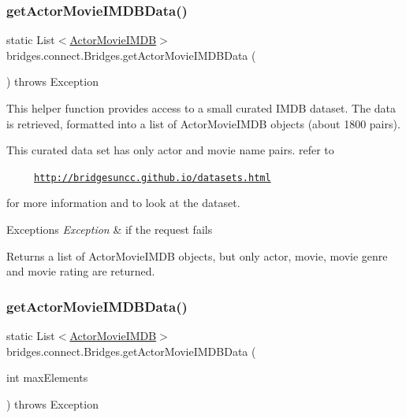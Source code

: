 \subsubsection{\texorpdfstring{get\+Actor\+Movie\+I\+M\+D\+B\+Data()}{getActorMovieIMDBData()}\hspace{0.1cm}{\footnotesize\ttfamily [1/2]}}
{\footnotesize\ttfamily static List$<$\mbox{\hyperlink{classbridges_1_1data__src__dependent_1_1_actor_movie_i_m_d_b}{Actor\+Movie\+I\+M\+DB}}$>$ bridges.\+connect.\+Bridges.\+get\+Actor\+Movie\+I\+M\+D\+B\+Data (\begin{DoxyParamCaption}{ }\end{DoxyParamCaption}) throws Exception\hspace{0.3cm}{\ttfamily [static]}}

This helper function provides access to a small curated I\+M\+DB dataset. The data is retrieved, formatted into a list of Actor\+Movie\+I\+M\+DB objects (about 1800 pairs).

This curated data set has only actor and movie name pairs. refer to 

~~~~~\href{http://bridgesuncc.github.io/datasets.html}{\tt http\+://bridgesuncc.\+github.\+io/datasets.\+html} 

for more information and to look at the dataset.


\begin{DoxyExceptions}{Exceptions}
{\em Exception} & if the request fails\\
\hline
\end{DoxyExceptions}
\begin{DoxyReturn}{Returns}
a list of Actor\+Movie\+I\+M\+DB objects, but only actor, movie, movie genre and movie rating are returned. 
\end{DoxyReturn}
\mbox{\label{classbridges_1_1connect_1_1_bridges_a76280ef69f0205e3711b18617e5c7646}} 
\subsubsection{\texorpdfstring{get\+Actor\+Movie\+I\+M\+D\+B\+Data()}{getActorMovieIMDBData()}\hspace{0.1cm}{\footnotesize\ttfamily [2/2]}}
{\footnotesize\ttfamily static List$<$\mbox{\hyperlink{classbridges_1_1data__src__dependent_1_1_actor_movie_i_m_d_b}{Actor\+Movie\+I\+M\+DB}}$>$ bridges.\+connect.\+Bridges.\+get\+Actor\+Movie\+I\+M\+D\+B\+Data (\begin{DoxyParamCaption}\item[{int}]{max\+Elements }\end{DoxyParamCaption}) throws Exception\hspace{0.3cm}{\ttfamily [static]}}

